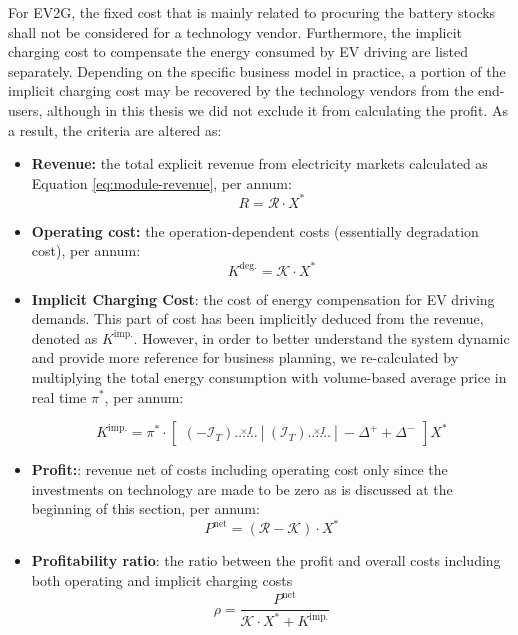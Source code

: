 For EV2G, the fixed cost that is mainly related to procuring the battery stocks shall not be considered for a technology vendor. Furthermore, the implicit charging cost to compensate the energy consumed by EV driving are listed separately. Depending on the specific business model in practice, a portion of the implicit charging cost may be recovered by the technology vendors from the end-users, although in this thesis we did not exclude it from calculating the profit. As a result, the criteria are altered as:
\begin{itemize}
	\item \textbf{Revenue:} the total explicit revenue from electricity markets calculated as Equation \eqref{eq:module-revenue}, per annum:
	\begin{equation*}
	R =  \mathcal{R} \cdot X^*
	\end{equation*}
	
	\item \textbf{Operating cost:} the operation-dependent costs (essentially degradation cost), per annum:
	\begin{equation*}
	K^{\text{deg.}} =  \mathcal{K} \cdot X^*
	\end{equation*}
	
	\item \textbf{Implicit Charging Cost}: the cost of energy compensation for EV driving demands. This part of cost has been implicitly deduced from the revenue, denoted as $K^{\text{imp.}}$. However, in order to better understand the system dynamic and provide more reference for business planning, we re-calculated by multiplying the total energy consumption with volume-based average price in real time $\pi^*$, per annum:
	
	\begin{equation*}
	K^{\text{imp.}} = \pi^* \cdot
	 \begin{bmatrix}
	\left(-\mathcal{I}_T\right) \stackrel{\times I}{\dots \dots}~|~\left( \mathcal{I}_T\right) \stackrel{\times I}{\dots \dots}~|~-\Delta^+ + \Delta^-
	\end{bmatrix} X^*
	\end{equation*}
	
	\item \textbf{Profit:}: revenue net of costs including operating cost only since the investments on technology are made to be zero as is discussed at the beginning of this section, per annum:
	\begin{equation*}
	P^{\text{net}} = \left( \mathcal{R} - \mathcal{K} \right) \cdot X^*
	\end{equation*}
	
	
	\item  \textbf{Profitability ratio}: the ratio between the profit and overall costs including both operating and implicit charging costs
	\begin{equation*}
	\rho = 	\frac{P^{\text{net}}}{\mathcal{K} \cdot X^* +K^{\text{imp.}}}
	\end{equation*}
	
\end{itemize}

